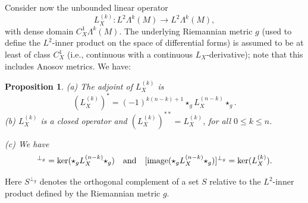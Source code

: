 \documentclass[11pt,letterpaper,reqno,abstract=true]{scrartcl}
\theoremstyle{plain}                              %
\newtheorem{prop}[thm]{Proposition}
\theoremstyle{definition}                         %
\theoremstyle{remark}                             %
\begin{document}
  Consider now the unbounded linear operator
  \begin{displaymath}
    L_X^{(k)} : L^2 \Lambda^k(M) \to L^2 \Lambda^k(M),
  \end{displaymath}
  with dense domain $C^1_X \Lambda^k(M)$. The underlying Riemannian
  metric $g$ (used to define the $L^2$-inner product on the space of
  differential forms) is assumed to be at least of class $C^1_X$
  (i.e., continuous with a continuous $L_X$-derivative); note that
  this includes Anosov metrics. We have:

  \begin{prop}     \label{prop:general-L_X}
    (a) The  adjoint of $L_X^{(k)}$ is
  \begin{displaymath}
    \left( L_X^{(k)} \right)^\ast = (-1)^{k(n-k) + 1} \star_g L_X^{(n-k)} \star_g.
  \end{displaymath}
  (b) $L_X^{(k)}$ is a closed operator and
  $\left( L_X^{(k)} \right)^{\ast \ast} = L_X^{(k)}$,  for all $0 \leq k \leq n$.

    \noindent (c) We have
    \begin{displaymath}
      [\text{\normalfont image}(L_X^{(k)})]^{\perp_g} =
      \ker(\star_g L_X^{(n-k)} \star_g) \quad
      \text{and} \quad [\text{\normalfont image}(\star_g L_X^{(n-k)}
      \star_g)]^{\perp_g} = \ker(L_X^{(k)}).
    \end{displaymath}
  \end{prop}

  Here $S^{\perp_g}$ denotes the orthogonal complement of a set $S$
  relative to the $L^2$-inner product defined by the Riemannian metric $g$.
  
\end{document}
